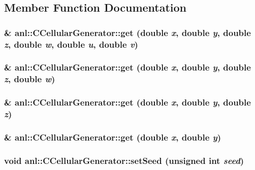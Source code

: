 \subsection{Member Function Documentation}
\hypertarget{classanl_1_1CCellularGenerator_a34445f6f242827320852d4cb83d8726f}{
\subsubsection[{get}]{ \& anl::CCellularGenerator::get (double {\em x}, \/  double {\em y}, \/  double {\em z}, \/  double {\em w}, \/  double {\em u}, \/  double {\em v})}}
\label{classanl_1_1CCellularGenerator_a34445f6f242827320852d4cb83d8726f}
\hypertarget{classanl_1_1CCellularGenerator_ae51488eee24d36d769f0e444ef73bb12}{
\subsubsection[{get}]{ \& anl::CCellularGenerator::get (double {\em x}, \/  double {\em y}, \/  double {\em z}, \/  double {\em w})}}
\label{classanl_1_1CCellularGenerator_ae51488eee24d36d769f0e444ef73bb12}
\hypertarget{classanl_1_1CCellularGenerator_a003a63d92632215c3ecaa66dda725c4d}{
\subsubsection[{get}]{ \& anl::CCellularGenerator::get (double {\em x}, \/  double {\em y}, \/  double {\em z})}}
\label{classanl_1_1CCellularGenerator_a003a63d92632215c3ecaa66dda725c4d}
\hypertarget{classanl_1_1CCellularGenerator_a882de06357888fd0dab4aff171bdcceb}{
\subsubsection[{get}]{ \& anl::CCellularGenerator::get (double {\em x}, \/  double {\em y})}}
\label{classanl_1_1CCellularGenerator_a882de06357888fd0dab4aff171bdcceb}
\hypertarget{classanl_1_1CCellularGenerator_a255ce3f91d89e15aa8f7f8f41aac1908}{
\subsubsection[{setSeed}]{\setlength{\rightskip}{0pt plus 5cm}void anl::CCellularGenerator::setSeed (unsigned int {\em seed})}}
\label{classanl_1_1CCellularGenerator_a255ce3f91d89e15aa8f7f8f41aac1908}


